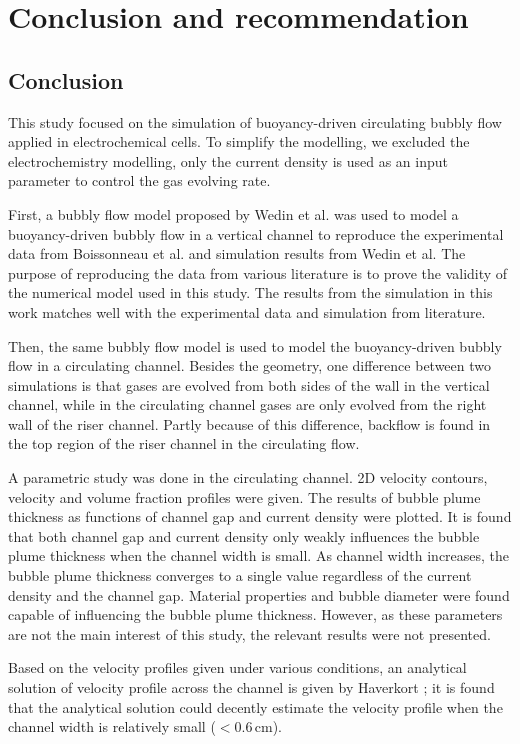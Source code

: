 \chapter{Conclusion and recommendation}

\section{Conclusion}
This study focused on the simulation of buoyancy-driven circulating bubbly flow applied in electrochemical cells. To simplify the modelling, we excluded the electrochemistry modelling, only the current density is used as an input parameter to control the gas evolving rate. 

First, a bubbly flow model proposed by Wedin et al. \cite{Wedin2001} was used to model a buoyancy-driven bubbly flow in a vertical channel to reproduce the experimental data from Boissonneau et al. \cite{Boissonneau2000} and simulation results from Wedin et al. The purpose of reproducing the data from various literature is to prove the validity of the numerical model used in this study. The results from the simulation in this work matches well with the experimental data and simulation from literature.

Then, the same bubbly flow model is used to model the buoyancy-driven bubbly flow in a circulating channel. Besides the geometry, one difference between two simulations is that gases are evolved from both sides of the wall in the vertical channel, while in the circulating channel gases are only evolved from the right wall of the riser channel. Partly because of this difference, backflow is found in the top region of the riser channel in the circulating flow.

A parametric study was done in the circulating channel. 2D velocity contours, velocity and volume fraction profiles were given. The results of bubble plume thickness as functions of channel gap and current density were plotted. It is found that both channel gap and current density only weakly influences the bubble plume thickness when the channel width is small. As channel width increases, the bubble plume thickness converges to a single value regardless of the current density and the channel gap. Material properties and bubble diameter were found capable of influencing the bubble plume thickness. However, as these parameters are not the main interest of this study, the relevant results were not presented. 

Based on the velocity profiles given under various conditions, an analytical solution of velocity profile across the channel is given by Haverkort \cite{Haverkort}; it is found that the analytical solution could decently estimate the velocity profile when the channel width is relatively small ($<0.6 \, \mathrm{cm}$).

